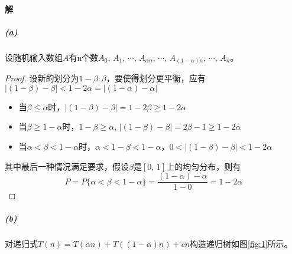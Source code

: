 \documentclass{article}
\begin{document}
\paragraph{解}
\subparagraph{(a)}
设随机输入数组$A$有n个数$A_0,\,A_1,\,\cdots,\,A_{\alpha n},\,\cdots,\,A_{(1 - \alpha)n},\,\cdots,\,A_n$。
\begin{proof}
设新的划分为$1 − \beta : \beta$，要使得划分更平衡，应有$|(1 - \beta) - \beta| < 1 - 2\alpha = |(1 - \alpha) - \alpha|$
\begin{itemize}

\item 当$\beta \leq \alpha$时，$|(1 - \beta) - \beta| = 1 - 2\beta \geq 1 - 2\alpha$

\item 当$\beta \geq 1 - \alpha$时，$1 - \beta \geq \alpha$, $|(1 - \beta) - \beta| = 2\beta - 1 \geq 1 - 2\alpha$

\item 当$\alpha < \beta < 1 - \alpha$时，$\alpha < 1 - \beta < 1 - \alpha$，$0<|(1 - \beta) - \beta|<1 - 2\alpha$

\end{itemize}
其中最后一种情况满足要求，假设$\beta$是$[0, \,1]$上的均匀分布，则有
\begin{equation*}
P = P\{\alpha < \beta < 1 - \alpha\}=\dfrac{(1 - \alpha) - \alpha}{1 - 0} = 1 - 2\alpha
\end{equation*}
\end{proof}
\subparagraph{(b)}
对递归式$T(n)=T(\alpha n) + T((1 - \alpha)n) + cn$构造递归树如图\ref{fig:1}所示。
\end{document}
